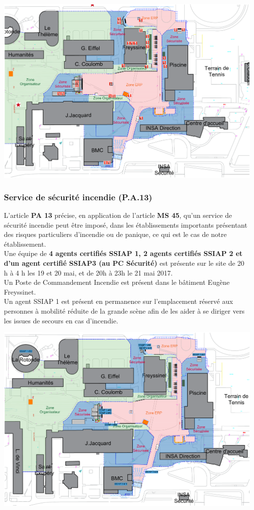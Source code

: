 \documentclass[hidelinks, paper=a4, fontsize=13pt]{report}
\begin{document}
\begin{center}
	\includegraphics[width=.8\textwidth,keepaspectratio]{Exports/Plan_24h_44eme-Extincteurs}
\end{center}


\subsubsection{Service de sécurité incendie (P.A.13)}

L’article \textbf{PA 13} précise, en application de l’article \textbf{MS 45}, qu’un service de sécurité incendie peut être imposé, dans les établissements importants présentant des risques particuliers d'incendie ou de panique, ce qui est le cas de notre établissement. \\

Une équipe de \textbf{4 agents certifiés SSIAP 1, 2 agents certifiés SSIAP 2 et d’un agent certifié SSIAP3 (au PC Sécurité)} est présente sur le site de 20 h à 4 h les 19 et 20  mai, et de 20h à 23h le 21 mai 2017. \\
Un Poste de Commandement Incendie est présent dans le bâtiment Eugène Freyssinet. \\

Un agent SSIAP 1 est présent en permanence sur l’emplacement réservé aux personnes à mobilité réduite de la grande scène afin de les aider à se diriger vers les issues de secours en cas d’incendie. 
\begin{center}
	\includegraphics[width=.8\textwidth,keepaspectratio]{Exports/Plan_24h_44eme-SSIAP}
\end{center}
\end{document}
